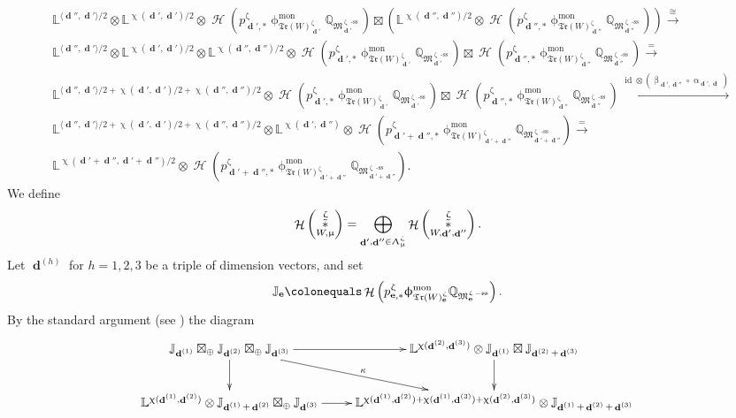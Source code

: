 \documentclass[a4paper,10pt]{amsart}
\renewcommand{\alpha}{\upalpha}
\renewcommand{\beta}{\upbeta}
\renewcommand{\zeta}{\upzeta}
\renewcommand{\chi}{\upchi}
\renewcommand{\Lambda}{\Uplambda}
\renewcommand{\phi}{\upphi}
\renewcommand{\mu}{\upmu}
\newcommand{\JJ}{\mathbb{J}}
\newcommand{\LL}{\mathbb{L}}
\newcommand{\QQ}{\mathbb{Q}}
\newcommand{\WWW}{\mathfrak{Tr}(W)}
\newcommand{\Mst}{\mathfrak{M}}
\newcommand{\phim}[1]{\phi^{\mon}_{#1}}
\DeclareMathOperator{\sst}{-ss}
\DeclareMathOperator{\mon}{mon}
\DeclareMathOperator{\ms}{\tilde{\ast}}
\DeclareMathOperator{\dd}{\mathbf{d}}
\DeclareMathOperator{\ee}{\mathbf{e}}
\DeclareMathOperator{\id}{id}
\DeclareMathOperator{\Ho}{\mathcal{H}}
\begin{document}
\begin{align*}
&\LL^{\langle\dd'',\dd'\rangle/2}\otimes\LL^{\chi(\dd',\dd')/2}\otimes\Ho\left(p^{\zeta}_{\dd',*}\phim{\WWW^{\zeta}_{\dd'}}\QQ_{\Mst_{\dd'}^{\zeta\sst}}\right)\boxtimes \left(\LL^{\chi(\dd'',\dd'')/2}\otimes\Ho\left(p^{\zeta}_{\dd'',*}\phim{\WWW^{\zeta}_{\dd''}}\QQ_{\Mst^{\zeta\sst}_{\dd''}}\right)\right)\xrightarrow{\cong}\\
&\LL^{\langle\dd'',\dd'\rangle/2}\otimes\LL^{\chi(\dd',\dd')/2}\otimes\LL^{\chi(\dd'',\dd'')/2}\otimes\Ho\left(p^{\zeta}_{\dd',*}\phim{\WWW^{\zeta}_{\dd'}}\QQ_{\Mst_{\dd'}^{\zeta\sst}}\right)\boxtimes \Ho\left(p^{\zeta}_{\dd'',*}\phim{\WWW^{\zeta}_{\dd''}}\QQ_{\Mst^{\zeta\sst}_{\dd''}}\right)\xrightarrow{=}\\
&\LL^{\langle\dd'',\dd'\rangle/2+\chi(\dd',\dd')/2+\chi(\dd'',\dd'')/2}\otimes\Ho\left(p^{\zeta}_{\dd',*}\phim{\WWW^{\zeta}_{\dd'}}\QQ_{\Mst_{\dd'}^{\zeta\sst}}\right)\boxtimes \Ho\left(p^{\zeta}_{\dd'',*}\phim{\WWW^{\zeta}_{\dd''}}\QQ_{\Mst^{\zeta\sst}_{\dd''}}\right)\xrightarrow{\id\otimes (\beta_{\dd',\dd''}\circ \alpha_{\dd',\dd})}\\
&\LL^{\langle\dd'',\dd'\rangle/2+\chi(\dd',\dd')/2+\chi(\dd'',\dd'')/2}\otimes\LL^{\chi(\dd',\dd'')}\otimes\Ho\left(p^{\zeta}_{\dd'+\dd'',*}\phim{\WWW^{\zeta}_{\dd'+\dd''}}\QQ_{\Mst_{\dd'+\dd''}^{\zeta\sst}}\right)\xrightarrow{=}\\
&\LL^{\chi(\dd'+\dd'',\dd'+\dd'')/2}\otimes \Ho\left(p^{\zeta}_{\dd'+\dd'',*}\phim{\WWW^{\zeta}_{\dd'+\dd''}}\QQ_{\Mst_{\dd'+\dd''}^{\zeta\sst}}\right).
\end{align*}
We define
\[
\Ho\left(\ms^{\zeta}_{W,\mu}\right)=\bigoplus_{\dd',\dd''\in\Lambda_{\mu}^{\zeta}}\Ho\left(\ms_{W,\dd',\dd''}^{\zeta}\right).
\]
Let $\dd^{(h)}$ for $h=1,2,3$ be a triple of dimension vectors, and set 
\[
\JJ_{\ee}\colonequals \Ho\left(p^{\zeta}_{\ee,*}\phim{\WWW^{\zeta}_{\ee}}\QQ_{\Mst_{\ee}^{\zeta\sst}}\right).
\]
By the standard argument (see \cite{KS2}) the diagram
\begin{align}
\label{Icom}
\xymatrix{
\JJ_{\dd^{(1)}}\boxtimes_{\oplus}\JJ_{\dd^{(2)}}\boxtimes_{\oplus}\JJ_{\dd^{(3)}}\ar[d]\ar[dr]^{\kappa}\ar[r]&\LL^{\chi(\dd^{(2)},\dd^{(3)})}\otimes\JJ_{\dd^{(1)}}\boxtimes \JJ_{\dd^{(2)}+\dd^{(3)}}\ar[d]
\\
\LL^{\chi(\dd^{(1)},\dd^{(2)})}\otimes \JJ_{\dd^{(1)}+\dd^{(2)}}\boxtimes_{\oplus}\JJ_{\dd^{(3)}}\ar[r]&\LL^{\chi(\dd^{(1)},\dd^{(2)})+\chi(\dd^{(1)},\dd^{(3)})+\chi(\dd^{(2)},\dd^{(3)})}\otimes \JJ_{\dd^{(1)}+\dd^{(2)}+\dd^{(3)}}
}
\end{align}
\end{document}
